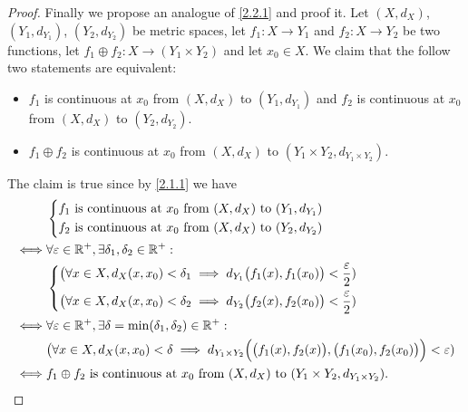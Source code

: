 \begin{proof}
  Finally we propose an analogue of \cref{2.2.1} and proof it.
  Let \((X, d_X)\), \((Y_1, d_{Y_1})\), \((Y_2, d_{Y_2})\) be metric spaces, let \(f_1 : X \to Y_1\) and \(f_2 : X \to Y_2\) be two functions, let \(f_1 \oplus f_2 : X \to (Y_1 \times Y_2)\) and let \(x_0 \in X\).
  We claim that the follow two statements are equivalent:
  \begin{itemize}
    \item \(f_1\) is continuous at \(x_0\) from \((X, d_X)\) to \((Y_1, d_{Y_1})\) and \(f_2\) is continuous at \(x_0\) from \((X, d_X)\) to \((Y_2, d_{Y_2})\).
    \item \(f_1 \oplus f_2\) is continuous at \(x_0\) from \((X, d_X)\) to \((Y_1 \times Y_2, d_{Y_1 \times Y_2})\).
  \end{itemize}
  The claim is true since by \cref{2.1.1} we have
  \begin{align*}
         & \begin{dcases}
             f_1 \text{ is continuous at } x_0 \text{ from } (X, d_X) \text{ to } (Y_1, d_{Y_1}) \\
             f_2 \text{ is continuous at } x_0 \text{ from } (X, d_X) \text{ to } (Y_2, d_{Y_2})
           \end{dcases}                                                                   \\
    \iff & \forall \varepsilon \in \mathbb{R}^+, \exists \delta_1, \delta_2 \in \mathbb{R}^+ :                                                                                   \\
         & \begin{dcases}
             \big(\forall x \in X, d_X(x, x_0) < \delta_1 \implies d_{Y_1}\big(f_1(x), f_1(x_0)\big) < \dfrac{\varepsilon}{2}) \\
             \big(\forall x \in X, d_X(x, x_0) < \delta_2 \implies d_{Y_2}\big(f_2(x), f_2(x_0)\big) < \dfrac{\varepsilon}{2})
           \end{dcases}                                     \\
    \iff & \forall \varepsilon \in \mathbb{R}^+, \exists \delta = \min(\delta_1, \delta_2) \in \mathbb{R}^+ :                                                                    \\
         & \big(\forall x \in X, d_X(x, x_0) < \delta \implies d_{Y_1 \times Y_2}\Big(\big(f_1(x), f_2(x)\big), \big(f_1(x_0), f_2(x_0)\big)\Big) < \varepsilon) \\
    \iff & f_1 \oplus f_2 \text{ is continuous at } x_0 \text{ from } (X, d_X) \text{ to } (Y_1 \times Y_2, d_{Y_1 \times Y_2}).
  \end{align*}
\end{proof}


